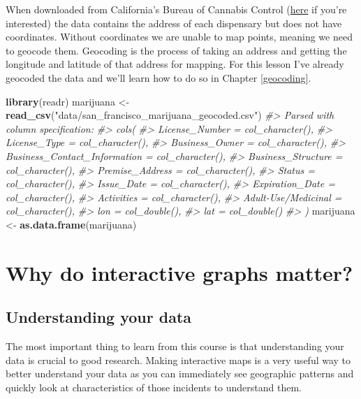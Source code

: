 \documentclass[
  12pt,
]{book}
\newenvironment{Shaded}{\begin{snugshade}}{\end{snugshade}}
\newcommand{\CommentTok}[1]{\textcolor[rgb]{0.56,0.35,0.01}{\textit{#1}}}
\newcommand{\KeywordTok}[1]{\textcolor[rgb]{0.13,0.29,0.53}{\textbf{#1}}}
\newcommand{\NormalTok}[1]{#1}
\newcommand{\StringTok}[1]{\textcolor[rgb]{0.31,0.60,0.02}{#1}}
\begin{document}
When downloaded from California's Bureau of Cannabis Control (\href{https://aca5.accela.com/bcc/customization/bcc/cap/licenseSearch.aspx}{here} if you're interested) the data contains the address of each dispensary but does not have coordinates. Without coordinates we are unable to map points, meaning we need to
geocode them. Geocoding is the process of taking an address and getting the longitude and latitude of that address for mapping. For this lesson I've already geocoded the data and we'll learn how to do so in Chapter \ref{geocoding}.

\begin{Shaded}
\begin{Highlighting}[]
\KeywordTok{library}\NormalTok{(readr)}
\NormalTok{marijuana <{-}}\StringTok{ }\KeywordTok{read\_csv}\NormalTok{(}\StringTok{"data/san\_francisco\_marijuana\_geocoded.csv"}\NormalTok{)}
\CommentTok{\#> Parsed with column specification:}
\CommentTok{\#> cols(}
\CommentTok{\#>   License\_Number = col\_character(),}
\CommentTok{\#>   License\_Type = col\_character(),}
\CommentTok{\#>   Business\_Owner = col\_character(),}
\CommentTok{\#>   Business\_Contact\_Information = col\_character(),}
\CommentTok{\#>   Business\_Structure = col\_character(),}
\CommentTok{\#>   Premise\_Address = col\_character(),}
\CommentTok{\#>   Status = col\_character(),}
\CommentTok{\#>   Issue\_Date = col\_character(),}
\CommentTok{\#>   Expiration\_Date = col\_character(),}
\CommentTok{\#>   Activities = col\_character(),}
\CommentTok{\#>   \textasciigrave{}Adult{-}Use/Medicinal\textasciigrave{} = col\_character(),}
\CommentTok{\#>   lon = col\_double(),}
\CommentTok{\#>   lat = col\_double()}
\CommentTok{\#> )}
\NormalTok{marijuana <{-}}\StringTok{ }\KeywordTok{as.data.frame}\NormalTok{(marijuana)}
\end{Highlighting}
\end{Shaded}

\hypertarget{why-do-interactive-graphs-matter}{%
\section{Why do interactive graphs matter?}\label{why-do-interactive-graphs-matter}}

\hypertarget{understanding-your-data}{%
\subsection{Understanding your data}\label{understanding-your-data}}

The most important thing to learn from this course is that understanding your data is crucial to good research. Making interactive maps is a very useful way to better understand your data as you can immediately see geographic patterns and quickly look at characteristics of those incidents to understand them.
\end{document}
